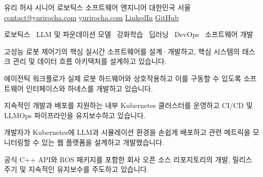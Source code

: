 \documentclass[10pt,a4paper]{article}
\begin{document}
\cvheader
  {유리 허샤}
  {시니어 로보틱스 소프트웨어 엔지니어}
  {대한민국 서울}
  {\href{mailto:contact@yurirocha.com}{contact@yurirocha.com}\enspace\textbullet\enspace
   \href{https://www.yurirocha.com}{yurirocha.com}\enspace\textbullet\enspace
   \href{https://www.linkedin.com/in/yurirocha15/}{LinkedIn}\enspace\textbullet\enspace
   \href{https://github.com/yurirocha15}{GitHub}}

{\small 로보틱스 \textbullet\ LLM 및 파운데이션 모델 \textbullet\ 강화학습 \textbullet\ 딥러닝 \textbullet\ DevOps \textbullet\ 소프트웨어 개발\par}


\begin{cvbullets}
  \item 고성능 로봇 제어기의 핵심 실시간 소프트웨어를 설계·개발하고, 핵심 시스템의 태스크 관리 및 데이터 흐름 아키텍처를 설계하고 있습니다.
  \item 에이전틱 워크플로가 실제 로봇 하드웨어와 상호작용하고 이를 구동할 수 있도록 소프트웨어 인터페이스와 하네스를 개발하고 있습니다.
  \item 지속적인 개발과 배포를 지원하는 내부 Kubernetes 클러스터를 운영하고 CI/CD 및 LLMOps 파이프라인을 유지보수하고 있습니다.
  \item 개발자가 Kubernetes에 LLM과 시뮬레이션 환경을 손쉽게 배포하고 관련 메트릭을 모니터링할 수 있는 웹 플랫폼을 설계하고 개발했습니다.
  \item 공식 C++ API와 ROS 패키지를 포함한 회사 오픈 소스 리포지토리의 개발, 릴리스 주기 및 지속적인 유지보수를 주도하고 있습니다.
\end{cvbullets}
\end{document}
